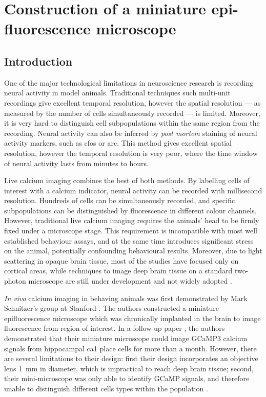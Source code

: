 \chapter{Construction of a miniature epi-fluorescence microscope \label{chap-scope}}

\section{Introduction}

One of the major technological limitations in neuroscience research is recording neural activity in model animals. Traditional techniques such multi-unit recordings give excellent temporal resolution, however the spatial resolution --- as measured by the number of cells simultaneously recorded --- is limited. Moreover, it is very hard to distinguish cell subpopulations within the same region from the recording. Neural activity can also be inferred by \textit{post mortem} staining of neural activity markers, such as cfos or arc. This method gives excellent spatial resolution, however the temporal resolution is very poor, where the time window of neural activity lasts from minutes to hours.

    Live calcium imaging combines the best of both methods. By labelling cells of interest with a calcium indicator, neural activity can be recorded with millisecond resolution. Hundreds of cells can be simultaneously recorded, and specific subpopulations can be distinguished by fluorescence in different colour channels. However, traditional live calcium imaging requires the animals' head to be firmly fixed under a microscope stage. This requirement is incompatible with most well established behaviour assays, and at the same time introduces significant stress on the animal, potentially confounding behavioural results. Moreover, due to light scattering in opaque brain tissue, most of the studies have focused only on cortical areas, while techniques to image deep brain tissue on a standard two-photon microscope are still under development and not widely adopted \citep{barretto12}.

    \textit{In vivo} calcium imaging in behaving animals was first demonstrated by Mark Schnitzer's group at Stanford \citep{ghosh11}. The authors constructed a miniature epifluorescence microscope which was chronically implanted in the brain to image fluorescence from region of interest. In a follow-up paper \citep{ziv13}, the authors demonstrated that their miniature microscope could image GCaMP3 calcium signals from hippocampal \gls{ca1} place cells for more than a month. However, there are several limitations to their design: first their design incorporates an objective lens \SI{1}{\mm}  in diameter, which is impractical to reach deep brain tissue; second, their mini-microscope was only able to identify GCaMP signals, and therefore unable to distinguish different cells types within the population \citep{ghosh11,ziv13}. 

